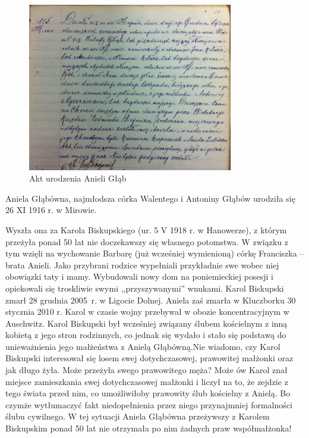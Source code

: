 \begin{figure}[!h]
\begin{center}
\includegraphics[width=0.8\textwidth]{zdjecia/akt_urodzenia_anieli_glab.jpg}
\caption{Akt urodzenia Anieli Głąb}
\label{rys:akt_urodzenia_anieli_glab}
\end{center}
\end{figure}

Aniela Głąbówna, najmłodsza córka Walentego i Antoniny Głąbów urodziła się 26 XI 1916 r. w Mirowie.

Wyszła ona za Karola Biskupskiego (ur. 5 V 1918 r. w Hanowerze), z którym przeżyła ponad 50 lat nie doczekawszy się własnego potomstwa. W związku z tym wzięli na wychowanie Barbarę (już wcześniej wymienioną) córkę Franciszka -- brata Anieli. Jako przybrani rodzice wypełniali przykładnie swe wobec niej obowiązki taty i mamy. Wybudowali nowy dom na poniemieckiej posesji i opiekowali się troskliwie swymi ,,przyszywanymi'' wnukami. Karol Biskupski zmarł 28 grudnia 2005~r. w Ligocie Dolnej. Aniela zaś zmarła w Kluczborku 30 stycznia 2010 r. Karol w czasie wojny przebywał w obozie koncentracyjnym w Auschwitz. Karol Biskupski był wcześniej związany ślubem kościelnym z inną kobietą z jego stron rodzinnych, co jednak się wydało i stało się podstawą do unieważnienia jego małżeństwa z Anielą Głąbówną.Nie wiadomo, czy Karol Biskupski interesował się losem swej dotychczasowej, prawowitej małżonki oraz jak długo żyła. Może przeżyła swego prawowitego męża? Może ów Karol znał miejsce zamieszkania swej dotychczasowej małżonki i liczył na to, że zejdzie z tego świata przed nim, co umożliwiłoby prawowity ślub kościelny z Anielą. Bo czymże wytłumaczyć fakt niedopełnienia przez niego przynajmniej formalności ślubu cywilnego. W tej sytuacji Aniela Głąbówna przeżywszy z Karolem Biskupskim ponad 50 lat nie otrzymała po nim żadnych praw współmałżonka! 


